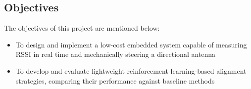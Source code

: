 \subsection{Objectives}

The objectives of this project are mentioned below:
\begin{itemize}
    \item To design and implement a low-cost embedded system capable of measuring RSSI in real time and mechanically steering a directional antenna
    \item To develop and evaluate lightweight reinforcement learning-based alignment strategies, comparing their performance against baseline methods
\end{itemize}